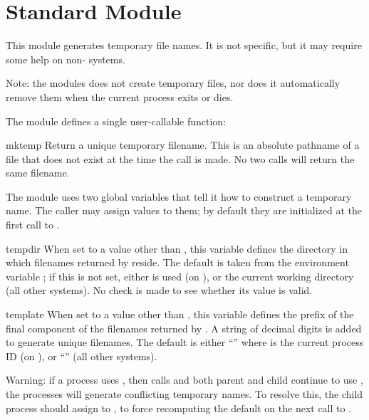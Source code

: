 \section{Standard Module }
\label{module-tempfile}

\renewcommand{\indexsubitem}{(in module tempfile)}

This module generates temporary file names.  It is not \UNIX{} specific,
but it may require some help on non-\UNIX{} systems.

Note: the modules does not create temporary files, nor does it
automatically remove them when the current process exits or dies.

The module defines a single user-callable function:

\begin{funcdesc}{mktemp}{}
Return a unique temporary filename.  This is an absolute pathname of a
file that does not exist at the time the call is made.  No two calls
will return the same filename.
\end{funcdesc}

The module uses two global variables that tell it how to construct a
temporary name.  The caller may assign values to them; by default they
are initialized at the first call to .

\begin{datadesc}{tempdir}
When set to a value other than , this variable defines the
directory in which filenames returned by  reside.  The
default is taken from the environment variable ; if this
is not set, either  is used (on \UNIX{}), or the current
working directory (all other systems).  No check is made to see
whether its value is valid.
\end{datadesc}

\begin{datadesc}{template}
When set to a value other than , this variable defines the
prefix of the final component of the filenames returned by
.  A string of decimal digits is added to generate
unique filenames.  The default is either ``'' where
 is the current process ID (on \UNIX{}), or ``'' (all
other systems).
\end{datadesc}

Warning: if a \UNIX{} process uses , then calls
 and both parent and child continue to use
, the processes will generate conflicting temporary
names.  To resolve this, the child process should assign 
to , to force recomputing the default on the next call
to .
